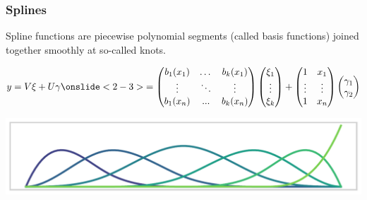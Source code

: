 \documentclass[final]{beamer}
\begin{document}
\begin{frame}[b]
\frametitle{Splines}

Spline functions are piecewise polynomial segments (called basis functions) joined together smoothly at so-called knots.
\begin{overprint}
\begin{align*}
y = V\xi + U\gamma 
\onslide<2-3>{
= \begin{pmatrix}
b_1(x_1) & \dots & b_k(x_1) \\
 \vdots  & \ddots & \vdots \\
b_1(x_n) & ... & b_k(x_n)
\end{pmatrix} 
\begin{pmatrix}
\xi_1 \\
 \vdots   \\
\xi_k 
\end{pmatrix} 
+ 
\begin{pmatrix}
1 &  x_1 \\
 \vdots & \vdots \\
1 & x_n
\end{pmatrix} 
\begin{pmatrix}
\gamma_1 \\
\gamma_2 
\end{pmatrix} 
}
\end{align*}


\end{overprint}




\begin{center}
\includegraphics[width=\textwidth]{Images/bases}
\end{center}

\end{frame}
\end{document}
